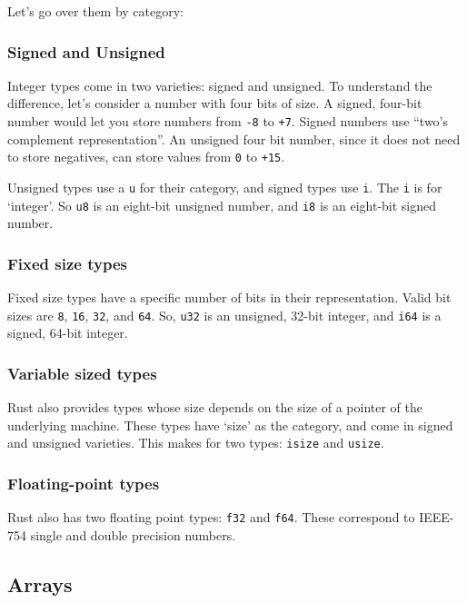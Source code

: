 \documentclass[a4paper,]{book}
\begin{document}
Let's go over them by category:

\subsubsection{Signed and Unsigned}\label{signed-and-unsigned}

Integer types come in two varieties: signed and unsigned. To understand
the difference, let's consider a number with four bits of size. A
signed, four-bit number would let you store numbers from \texttt{-8} to
\texttt{+7}. Signed numbers use ``two's complement representation''. An
unsigned four bit number, since it does not need to store negatives, can
store values from \texttt{0} to \texttt{+15}.

Unsigned types use a \texttt{u} for their category, and signed types use
\texttt{i}. The \texttt{i} is for `integer'. So \texttt{u8} is an
eight-bit unsigned number, and \texttt{i8} is an eight-bit signed
number.

\subsubsection{Fixed size types}\label{fixed-size-types}

Fixed size types have a specific number of bits in their representation.
Valid bit sizes are \texttt{8}, \texttt{16}, \texttt{32}, and
\texttt{64}. So, \texttt{u32} is an unsigned, 32-bit integer, and
\texttt{i64} is a signed, 64-bit integer.

\subsubsection{Variable sized types}\label{variable-sized-types}

Rust also provides types whose size depends on the size of a pointer of
the underlying machine. These types have `size' as the category, and
come in signed and unsigned varieties. This makes for two types:
\texttt{isize} and \texttt{usize}.

\subsubsection{Floating-point types}\label{floating-point-types}

Rust also has two floating point types: \texttt{f32} and \texttt{f64}.
These correspond to IEEE-754 single and double precision numbers.

\subsection{Arrays}\label{arrays}
\end{document}
